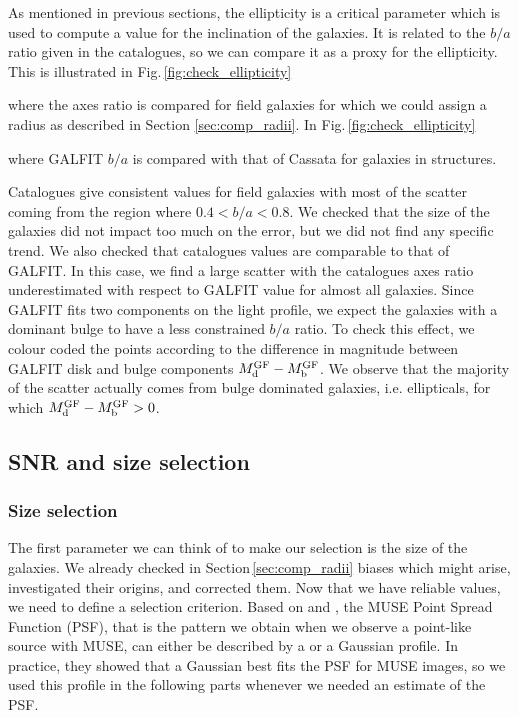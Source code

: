As mentioned in previous sections, the ellipticity is a critical parameter which is used to compute a value for the inclination of the galaxies. It is related to the $b/a$ ratio given in the catalogues, so we can compare it as a proxy for the ellipticity. This is illustrated in Fig.\,\ref{fig:check_ellipticity} 
\begin{enumerate*}[label={(\alph*)}]
	\item where the axes ratio is compared for field galaxies for which we could assign a radius as described in Section \ref{sec:comp_radii}. In Fig.\,\ref{fig:check_ellipticity}
	\item where GALFIT $b/a$ is compared with that of Cassata for galaxies in structures.
\end{enumerate*}
Catalogues give consistent values for field galaxies with most of the scatter coming from the region where $0.4 < b/a < 0.8$. We checked that the size of the galaxies did not impact too much on the error, but we did not find any specific trend. We also checked that catalogues values are comparable to that of GALFIT. In this case, we find a large scatter with the catalogues axes ratio underestimated with respect to GALFIT value for almost all galaxies. Since GALFIT fits two components on the light profile, we expect the galaxies with a dominant bulge to have a less constrained $b/a$ ratio. To check this effect, we colour coded the points according to the difference in magnitude between GALFIT disk and bulge components $M_{\rm{d}}^{\rm{GF}} - M_{\rm{b}}^{\rm{GF}}$. We observe that the majority of the scatter actually comes from bulge dominated galaxies, i.e. ellipticals, for which $M_{\rm{d}}^{\rm{GF}} - M_{\rm{b}}^{\rm{GF}} > 0$.















\subsection{SNR and size selection}
\label{sec:cut}

\subsubsection{Size selection}
\label{sec:cut_size}

The first parameter we can think of to make our selection is the size of the galaxies. We already checked in Section\,\ref{sec:comp_radii} biases which might arise, investigated their origins, and corrected them. Now that we have reliable values, we need to define a selection criterion. Based on  and , the MUSE Point Spread Function (PSF), that is the pattern we obtain when we observe a point-like source with MUSE, can either be described by   a  or a Gaussian profile. In practice, they showed that a Gaussian best fits the PSF for MUSE images, so we used this profile in the following parts whenever we needed an estimate of the PSF. \\

